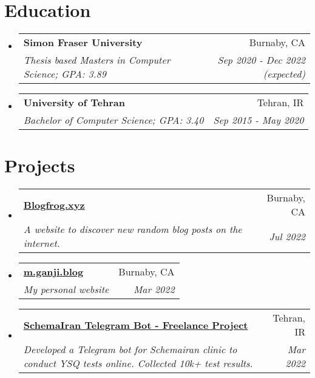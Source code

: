 \documentclass[letterpaper,10.8pt]{article}
\makeatletter
\newcommand{\resumeItemWithTitle}[2]{
  \item\small{
    \textbf{#1}{: #2 \vspace{-4pt}}
  }
}
\newcommand{\resumeSubheading}[4]{
  \vspace{-1pt}\item
    \begin{tabular*}{0.97\textwidth}{l@{\extracolsep{\fill}}r}
      \textbf{#1} & #2 \\
      \textit{\small#3} & \textit{\small #4} \\
    \end{tabular*}\vspace{-5pt}
}
\newcommand{\resumeSubItem}[2]{\resumeItemWithTitle{#1}{#2}\vspace{-4pt}}
\newcommand{\resumeSubHeadingListStart}{\begin{itemize}[leftmargin=*]}
\newcommand{\resumeSubHeadingListEnd}{\end{itemize}}
\makeatother
\begin{document}
\section{Education}
  \resumeSubHeadingListStart
    \resumeSubheading
      {Simon Fraser University}{Burnaby, CA}
      {Thesis based Masters in Computer Science;  GPA: 3.89}{Sep 2020 - Dec 2022 (expected)}
      
	    
    \resumeSubheading
      {University of Tehran}{Tehran, IR}
      {Bachelor of Computer Science;  GPA: 3.40}{Sep 2015 - May 2020}
  \resumeSubHeadingListEnd

\section{Projects}

\resumeSubHeadingListStart
    \resumeSubheading
      {\href{http://blogfrog.xyz}{Blogfrog.xyz}}{Burnaby, CA}
      {A website to discover new random blog posts on the internet.}{Jul 2022}
	    
    \resumeSubheading
      {\href{http://m.ganji.blog}{m.ganji.blog}}{Burnaby, CA}
      {My personal website}{Mar 2022}
      
    \resumeSubheading
      {\href{https://t.me/SchemaIran_Bot}{SchemaIran Telegram Bot - Freelance Project}}{Tehran, IR}
      {Developed a Telegram bot for Schemairan clinic to conduct YSQ tests online. Collected 10k+ test results.}{Mar 2022}
\resumeSubHeadingListEnd

\end{document}
